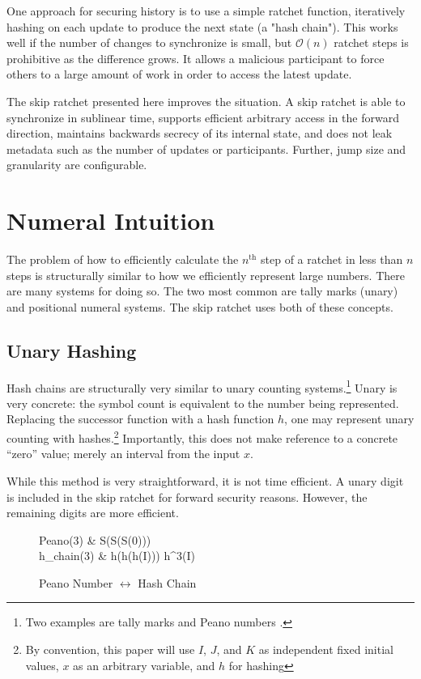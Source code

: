 \documentclass[twocolumn]{article}
\begin{document}
    One approach for securing history is to use a simple ratchet function, iteratively hashing on each update to produce the next state (a "hash chain"). This works well if the number of changes to synchronize is small, but $\mathcal{O}(n)$ ratchet steps is prohibitive as the difference grows. It allows a malicious participant to force others to a large amount of work in order to access the latest update.
    
    The skip ratchet presented here improves the situation. A skip ratchet is able to synchronize in sublinear time, supports efficient arbitrary access in the forward direction, maintains backwards secrecy of its internal state, and does not leak metadata such as the number of updates or participants. Further, jump size and granularity are configurable.
    
    \section{Numeral Intuition}
    
    The problem of how to efficiently calculate the $n^{\text{th}}$ step of a ratchet in less than $n$ steps is structurally similar to how we efficiently represent large numbers. There are many systems for doing so. The two most common are tally marks (unary) and positional numeral systems. The skip ratchet uses both of these concepts.
    
	\subsection{Unary Hashing}

	Hash chains are structurally very similar to unary counting systems.\footnote{Two examples are tally marks and Peano numbers \cite{peano-wikipedia}.} Unary is very concrete: the symbol count is equivalent to the number being represented. Replacing the successor function with a hash function $h$, one may represent unary counting with hashes.\footnote{By convention, this paper will use $I$, $J$, and $K$ as independent fixed initial values, $x$ as an arbitrary variable, and $h$ for hashing} Importantly, this does not make reference to a concrete ``zero'' value; merely an interval from the input $x$.
	
	While this method is very straightforward, it is not time efficient. A unary digit is included in the skip ratchet for forward security reasons. However, the remaining digits are more efficient.
	
    \begin{figure}[h]
		\centering
		
		\begin{flalign}
			Peano(3) & \Rightarrow S(S(S(0))) \nonumber \\
			h_{chain}(3)  & \Rightarrow h(h(h(I))) \equiv h^{3}(I) \nonumber 
		\end{flalign}
	
		\caption{Peano Number $\leftrightarrow$ Hash Chain}
		\label{fig:peano-hash-equiv}
	\end{figure}
    
\end{document}
